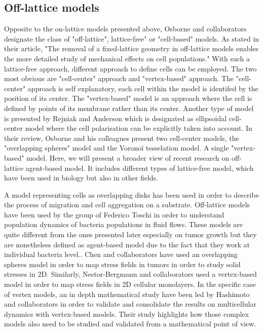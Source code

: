 \documentclass[11pt,a4paper]{article}
\begin{document}
\subsection{Off-lattice models}
Opposite to the on-lattice models presented above, Osborne and collaborators designate the class of "off-lattice", lattice-free" or "cell-based" models. As stated in their article, "The removal of a fixed-lattice geometry in off-lattice models enables the more detailed study of mechanical effects on cell populations." With such a lattice-free approach, different approach to define cells can be employed. The two most obvious are "cell-center" approach and "vertex-based" approach. The "cell-center" approach is self explanatory, each cell within the model is identifed by the position of its center. The "vertex-based" model is an approach where the cell is defined by points of its membrane rather than its center. Another type of model is presented by Rejniak and Anderson which is designated as ellipsoidal cell-center model where the cell polarisation can be explicitly taken into account.\cite{Rejniak2011} 
In their review, Osborne and his colleagues present two cell-center models, the "overlapping spheres" model and the Voronoï tesselation model. A single "vertex-based" model. Here, we will present a broader view of recent research on off-lattice agent-based model. It includes different types of lattice-free model, which have been used in biology but also in other fields.

A model representing cells as overlapping disks has been used in order to describe the process of migration and cell aggregation on a substrate.\cite{Adenis2020}
Off-lattice models have been used by the group of Federico Toschi in order to understand population dynamics of bacteria populations in fluid flows. These models are quite different from the ones presented later especially on tumor growth but they are nonetheless defined as agent-based model due to the fact that they work at individual bacteria level.\cite{Plummer2018}\cite{Guccione2019}. Chen and collaborators have used an overlapping spheres model in order to map stress fields in tumors in order to study solid stresses in 2D.\cite{Chen2020} Similarly, Nestor-Bergmann and collaborators used a vertex-based model in order to map stress fields in 2D cellular monolayers.\cite{NestorBergmann2017} In the specific case of vertex models, an in depth mathematical study have been led by Hashimoto and collaborators in order to validate and consolidate the results on multicellular dynamics with vertex-based models.\cite{Hashimoto2017} Their study highlights how those complex models also need to be studied and validated from a mathematical point of view.
\end{document}
